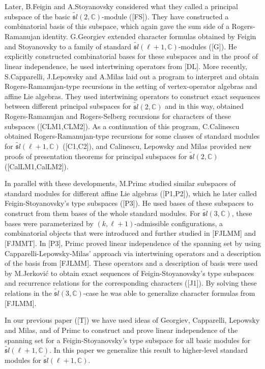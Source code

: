 \documentclass[a4paper, 10pt,oneside]{amsart}
\begin{document}
Later,  B.Feigin and A.Stoyanovsky considered what they called a
principal subspace of the basic $\tilde{{\mathfrak sl}}(2,{{\mathbb C}})$-module
([FS]). They have constructed a combinatorial basis of this
subspace, which again gave the sum side of a Rogers-Ramanujan
identity. G.Georgiev extended character formulas obtained by
Feigin and Stoyanovsky to a family of standard
$\tilde{{\mathfrak sl}}(\ell+1,{{\mathbb C}})$-modules ([G]). He explicitly constructed
combinatorial bases for these subspaces and in the proof of linear
independence, he used intertwining operators from [DL]. More
recently, S.Capparelli, J.Lepowsky and A.Milas laid out a program
to interpret and obtain Rogers-Ramanujan-type recursions in the
setting of vertex-operator algebras and affine Lie algebras. They
used intertwining operators to construct exact sequences between
different principal subspaces for $\tilde{{\mathfrak sl}}(2,{{\mathbb C}})$ and in this
way, obtained Rogers-Ramanujan and Rogers-Selberg recursions for
characters of these subspaces ([CLM1,CLM2]). As a continuation of
this program, C.Calinescu obtained Rogers-Ramanujan-type
recursions for some classes of standard modules for
$\tilde{{\mathfrak sl}}(\ell+1,{{\mathbb C}})$ ([C1,C2]), and Calinescu, Lepowsky and
Milas provided new proofs of presentation theorems for principal
subspaces for $\tilde{{\mathfrak sl}}(2,{{\mathbb C}})$ ([CalLM1,CalLM2]).

In parallel with these developments, M.Primc studied similar
subspaces of standard modules for different affine Lie algebras
([P1,P2]), which he later called Feigin-Stoyanovsky's type
subspaces ([P3]). He used bases of these subspaces to construct
from them bases of the whole standard modules. For
$\tilde{{\mathfrak sl}}(3,{{\mathbb C}})$, these bases were parameterized
 by $(k,\ell+1)$-admissible configurations, a combinatorial objects that were introduced and further studied in [FJLMM] and [FJMMT].
In [P3], Primc proved linear independence of the spanning set by
using Capparelli-Lepowsky-Milas' approach via intertwining
operators and a description of the basis from [FJLMM]. These
operators and a description of basis were used by M.Jerkovi\' c to
obtain exact sequences of Feigin-Stoyanovsky's type subspaces and
recurrence relations for the corresponding characters ([J1]). By
solving these relations in the $\tilde{{\mathfrak sl}}(3,{{\mathbb C}})$-case he was
able to generalize character formulas from [FJLMM].

In our previous paper ([T]) we have used ideas of Georgiev,
Capparelli, Lepowsky and Milas, and of Primc to construct and
prove linear independence of the spanning set for a
Feigin-Stoyanovsky's type subspace for all basic modules for
$\tilde{{\mathfrak sl}}(\ell+1,{{\mathbb C}})$. In this paper we generalize this result
to higher-level standard modules for $\tilde{{\mathfrak sl}}(\ell+1,{{\mathbb C}})$.
\end{document}

